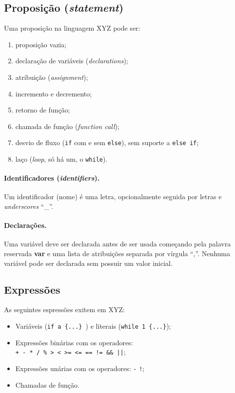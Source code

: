\documentclass{article}
\def\lang{{\sc XYZ}}
\begin{document}
\subsection*{Proposição ({\it statement})}

Uma proposição na linguagem \lang{} pode ser:

\begin{enumerate}
\item proposição vazia;
\item declaração de variáveis ({\it declarations});
\item atribuição ({\it assignment});
\item incremento e decremento;
\item retorno de função;
\item chamada de função ({\it function call});
\item desvio de fluxo ({\tt if} com e sem {\tt else}), 
	sem suporte a {\tt else if};
\item laço ({\it loop}, só há um, o {\tt while}).
\end{enumerate}

\paragraph{Identificadores ({\it identifiers}).}
Um identificador (nome) é uma letra, opcionalmente seguida
por letras e {\it underscores} ``\_''.

\paragraph{Declarações.}
Uma variável deve ser declarada antes de ser usada começando
pela palavra reservada {\bf var} e uma lista de atribuições 
separada por vírgula ``,''. Nenhuma variável pode ser 
declarada sem possuir um valor inicial.

\subsection*{Expressões}
As seguintes espressões exitem em \lang:

\begin{itemize}
\item Variáveis ({\tt if a \{...\} }) e literais 
({\tt while 1 \{...\}});
\item Expressões binárias com os operadores: \\
{\tt + - * / \% > < >= <= == != \&\& ||};
\item Expressões unárias com os operadores:
	{\tt -} {\tt !};
\item Chamadas de função.
\end{itemize}
\end{document}
